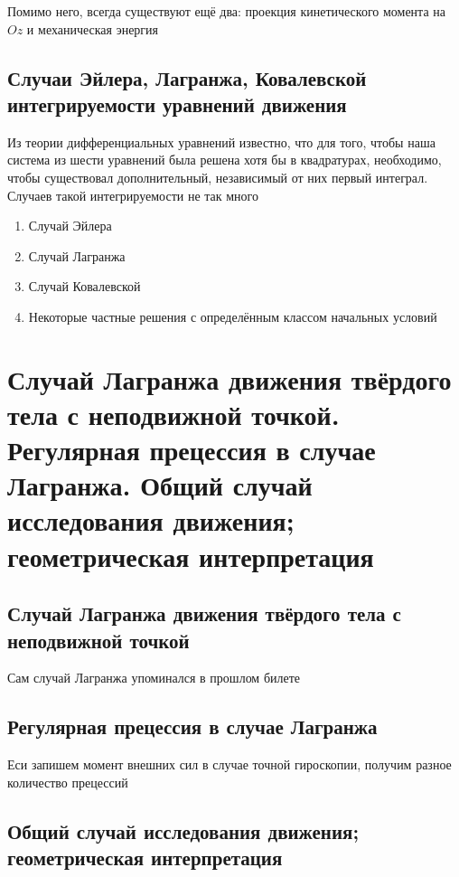 \documentclass[a4paper, 14pt]{article}
\begin{document}
    Помимо него, всегда существуют ещё два: проекция кинетического момента на $Oz$ и механическая энергия
    
    \subsection{Случаи Эйлера, Лагранжа, Ковалевской интегрируемости уравнений движения}
    
    Из теории дифференциальных уравнений известно, что для того, чтобы наша система из шести уравнений была решена
    хотя бы в квадратурах, необходимо, чтобы существовал дополнительный, независимый от них первый интеграл.
    Случаев такой интегрируемости не так много
    
    \begin{enumerate}
        \item Случай Эйлера
        \item Случай Лагранжа
        \item Случай Ковалевской
        \item Некоторые частные решения с определённым классом начальных условий
    \end{enumerate}
    
    \section{Случай Лагранжа движения твёрдого тела с неподвижной точкой.
    Регулярная прецессия в случае Лагранжа.
    Общий случай исследования движения; геометрическая интерпретация}
    
    \subsection{Случай Лагранжа движения твёрдого тела с неподвижной точкой}
    
    Сам случай Лагранжа упоминался в прошлом билете
    
    \subsection{Регулярная прецессия в случае Лагранжа}
    
    Еси запишем момент внешних сил в случае точной гироскопии, получим разное количество прецессий
    
    \subsection{Общий случай исследования движения; геометрическая интерпретация}
    
\end{document}
